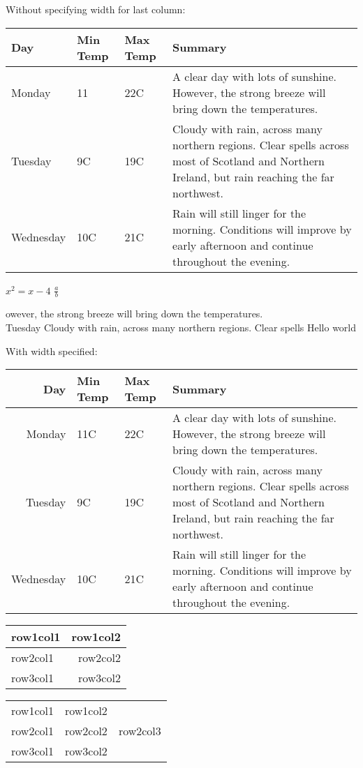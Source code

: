 \documentclass{article}
\begin{document}
Without specifying width for last column:

\begin{table}[h]
    \begin{tabular}{  l  l  l  l}
    \hline
    Day & Min Temp & Max Temp & Summary \\ \hline
    Monday & 11 & 22C & A clear day with lots of sunshine.
    However, the strong breeze will bring down the temperatures. \\ \hline
    Tuesday & 9C & 19C & Cloudy with rain, across many northern regions. Clear spells
    across most of Scotland and Northern Ireland,
    but rain reaching the far northwest. \\ \hline
    Wednesday & 10C & 21C & Rain will still linger for the morning.
    Conditions will improve by early afternoon and continue
    throughout the evening. \\
    \hline
    \end{tabular}
\end{table}

$ x^2 = x - 4 $
$ \frac{a}{b} $

owever, the strong breeze will bring down the temperatures. \\ Tuesday Cloudy with rain, across many northern regions. Clear spells
Hello \hspace world

With width specified:

\begin{table}[h]
    \begin{tabular}{ | r | l | l | l}
  \hline
    Day & Min Temp & Max Temp & Summary \\ \hline
    Monday & 11C & 22C & A clear day with lots of sunshine.  
    However, the strong breeze will bring down the temperatures. \\ \hline
    Tuesday & 9C & 19C & Cloudy with rain, across many northern regions. Clear spells
    across most of Scotland and Northern Ireland,
    but rain reaching the far northwest. \\ \hline
    Wednesday & 10C & 21C & Rain will still linger for the morning.
    Conditions will improve by early afternoon and continue
    throughout the evening. \\
    \hline
    \end{tabular}
\end{table}


\begin{table}[h]
    \begin{tabular}{|l|r|}
  \hline
       row1col1 & row1col2 \\ 
	\hline 
       row2col1 & row2col2 \\
       \hline \hline \hline \hline
       row3col1 & row3col2 \\
	\hline
     \end{tabular}

  \begin{tabular}{c|c c|}
       row1col1 & row1col2 \\
       row2col1 & row2col2 & row2col3 \\
       row3col1 & row3col2 \\
	
     \end{tabular}
\end{table}
\end{document}
